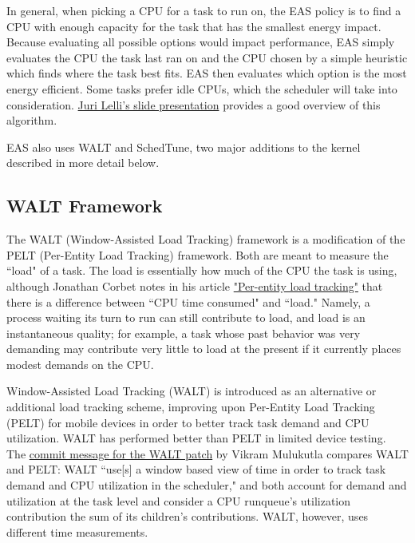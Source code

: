 \documentclass{article}
\begin{document}
\par
In general, when picking a CPU for a task to run on, the EAS policy is to find a CPU with enough capacity for the task that has the smallest energy impact. Because evaluating all possible options would impact performance, EAS simply evaluates the CPU the task last ran on and the CPU chosen by a simple heuristic which finds where the task best fits. EAS then evaluates which option is the most energy efficient. Some tasks prefer idle CPUs, which the scheduler will take into consideration. \href{https://www.slideshare.net/linaroorg/las16105-walkthrough-of-the-eas-kernel-adaptation-to-the-android-common-kernel}{Juri Lelli's slide presentation} provides a good overview of this algorithm.

EAS also uses WALT and SchedTune, two major additions to the kernel described in more detail below.

\subsection{WALT Framework}
The WALT (Window-Assisted Load Tracking) framework is a modification of the PELT (Per-Entity Load Tracking) framework. Both are meant to measure the ``load" of a task. The load is essentially how much of the CPU the task is using, although Jonathan Corbet notes in his article \href{https://lwn.net/Articles/531853/}{"Per-entity load tracking"} that there is a difference between ``CPU time consumed" and ``load." Namely, a process waiting its turn to run can still contribute to load, and load is an instantaneous quality; for example, a task whose past behavior was very demanding may contribute very little to load at the present if it currently places modest demands on the CPU. 

\par 
Window-Assisted Load Tracking (WALT) is introduced as an alternative or additional load tracking scheme, improving upon Per-Entity Load Tracking (PELT) for mobile devices in order to better track task demand and CPU utilization. WALT has performed better than PELT in limited device testing. The \href{https://lwn.net/Articles/704903/}{commit message for the WALT patch} by Vikram Mulukutla compares WALT and PELT: WALT ``use[s] a window based view of time in order to track task demand and CPU utilization in the scheduler," and both account for demand and utilization at the task level and consider a CPU runqueue's utilization contribution the sum of its children's contributions. WALT, however, uses different time measurements. 
\end{document}
